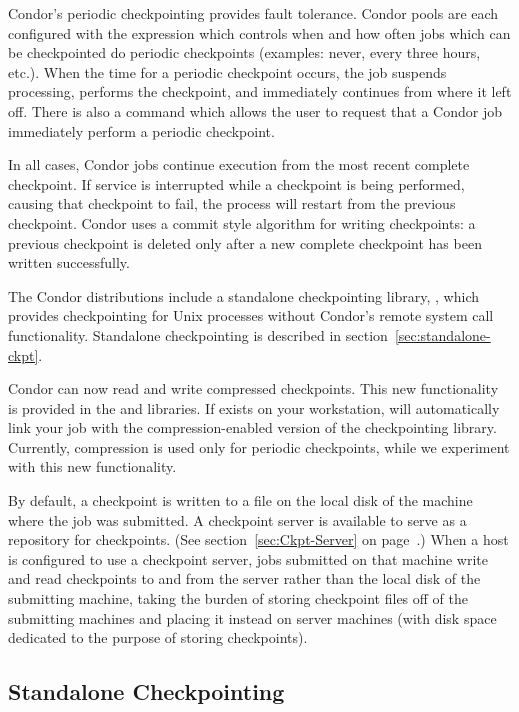 Condor's periodic checkpointing provides fault tolerance.  Condor
pools are each configured with the 
expression which controls when and how often jobs which can be
checkpointed do periodic checkpoints (examples: never, every three
hours, etc.).  When the time for a periodic checkpoint occurs, the job
suspends processing, performs the checkpoint, and immediately
continues from where it left off.  There is also a  command
which allows the user to request that a Condor job immediately perform
a periodic checkpoint.

In all cases, Condor jobs continue execution from the most recent
complete checkpoint.  If service is interrupted while a checkpoint is
being performed, causing that checkpoint to fail, the process will
restart from the previous checkpoint.  Condor uses a commit style
algorithm for writing checkpoints: a previous checkpoint is deleted
only after a new complete checkpoint has been written successfully.

The Condor distributions include a standalone checkpointing library,
, which provides checkpointing for Unix
processes without Condor's remote system call functionality.
Standalone checkpointing is described in
section~\ref{sec:standalone-ckpt}.

Condor can now read and write compressed checkpoints.  This new
functionality is provided in the  and
 libraries.  
If  exists on your workstation, 
will automatically link your job with the compression-enabled version
of the checkpointing library.
Currently, compression is used only for periodic checkpoints, while we
experiment with this new functionality.

By default, a checkpoint is written to a file on the local disk of the
machine where the job was submitted.  A checkpoint server is available
to serve as a repository for checkpoints.  (See
section~\ref{sec:Ckpt-Server} on page~\pageref{sec:Ckpt-Server}.)
When a host is configured to use a checkpoint server, jobs submitted
on that machine write and read checkpoints to and from the server
rather than the local disk of the submitting machine, taking the
burden of storing checkpoint files off of the submitting machines and
placing it instead on server machines (with disk space dedicated to
the purpose of storing checkpoints).

\subsection{\label{sec:standalone-ckpt}Standalone Checkpointing}


